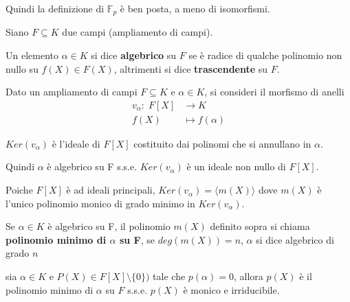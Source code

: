 \documentclass[../main.tex]{subfiles}
\begin{document}
Quindi la definizione di $\mathbb{F}_p$ è ben posta, a meno di isomorfismi.

\begin{definition}
    Siano $F \subseteq K$ due campi (ampliamento di campi).

    Un elemento $\alpha \in K$ si dice \textbf{algebrico} su $F$ se è radice di qualche polinomio non nullo su $f(X) \in F(X)$, altrimenti si dice \textbf{trascendente} su $F$.
\end{definition}

Dato un ampliamento di campi $F \subseteq K$ e  $\alpha \in K$, si consideri il morfismo di anelli
\begin{align*}
    v_\alpha : \; F[X] & \rightarrow K     \\
    f(X)               & \mapsto f(\alpha)
\end{align*}

$Ker(v_\alpha)$ è l'ideale di $F[X]$ costituito dai polinomi che si annullano in $\alpha$.

Quindi $\alpha$ è algebrico su F s.s.e. $Ker(v_\alpha)$ è un ideale non nullo di $F[X]$.

Poiche $F[X]$ è ad ideali principali, $Ker(v_\alpha) = \langle m(X)\rangle$ dove $m(X)$ è l'unico polinomio monico di grado minimo in $Ker(v_\alpha)$.

\begin{definition}
    Se $\alpha \in K$ è algebrico su F, il polinomio $m(X)$ definito sopra si chiama \textbf{polinomio minimo di $\alpha$ su F}, se $deg(m(X)) = n$, $\alpha $ si dice algebrico di grado $n$
\end{definition}

\begin{note}
    sia $\alpha \in K$ e $P(X) \in F[X] \setminus \{0\})$ tale che $p(\alpha) = 0$, allora $p(X)$ è il polinomio minimo di $\alpha$ su $F$ s.s.e. $p(X)$ è monico e irriducibile.
\end{note}
\end{document}
